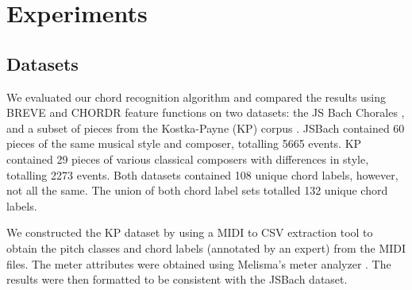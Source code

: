 \documentclass{article} %
\begin{document}
%
%
%
%
%
%
%
%
%
%
%
%
%
%
%
%

\newpage

\section{Experiments}

\subsection{Datasets}

We evaluated our chord recognition algorithm and compared the results using BREVE and CHORDR feature functions on two datasets: the JS Bach Chorales \cite{coral}, and a subset of pieces from the Kostka-Payne (KP) corpus \cite{kpcorpus}. JSBach contained 60 pieces of the same musical style and composer, totalling 5665 events. KP contained 29 pieces of various classical composers with differences in style, totalling 2273 events. Both datasets contained 108 unique chord labels, however, not all the same. The union of both chord label sets totalled 132 unique chord labels.

We constructed the KP dataset by using a MIDI to CSV extraction tool \cite{midicsv} to obtain the pitch classes and chord labels (annotated by an expert) from the MIDI files. The meter attributes were obtained using Melisma’s meter analyzer \cite{mitpress}. The results were then formatted to be consistent with the JSBach dataset.
\end{document}
